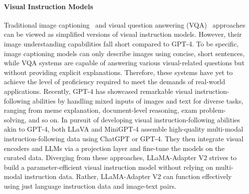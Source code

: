 \documentclass[10pt,twocolumn,letterpaper]{article}
\begin{document}
\paragraph{Visual Instruction Models}
Traditional image captioning~\cite{vinyals2016show,lu2017knowing, anderson2018bottom, hossain2019comprehensive, cornia2020meshed,li2023blip} and visual question answering (VQA)~\cite{gao2019dynamic, lu2019vilbert, li2019visualbert, pmlr-v139-kim21k, scienceqa, Min2021FILMFI, zhou2020unified, goyal2017making, alayrac2022flamingo} approaches can be viewed as simplified versions of visual instruction models. However, their image understanding capabilities fall short compared to GPT-4. 
To be specific, image captioning models can only describe images using concise, short sentences, while VQA systems are capable of answering various visual-related questions but without providing explicit explanations. Therefore, these systems have yet to achieve the level of proficiency required to meet the demands of real-world applications. Recently, GPT-4 has showcased remarkable visual instruction-following abilities by handling mixed inputs of images and text for diverse tasks, ranging from meme explanation, document-level reasoning, exam problem-solving, and so on. In pursuit of developing visual instruction-following abilities akin to GPT-4, both LLaVA \cite{liu2023visual} and MiniGPT-4 \cite{zou2022xdecoder} assemble high-quality multi-modal instruction-following data using ChatGPT or GPT-4. They then integrate visual encoders and LLMs via a projection layer and fine-tune the models on the curated data. Diverging from these approaches, LLaMA-Adapter V2 strives to build a parameter-efficient visual instruction model without relying on multi-modal instruction data. Rather, LLaMA-Adapter V2 can function effectively using just language instruction data and image-text pairs.
\end{document}

